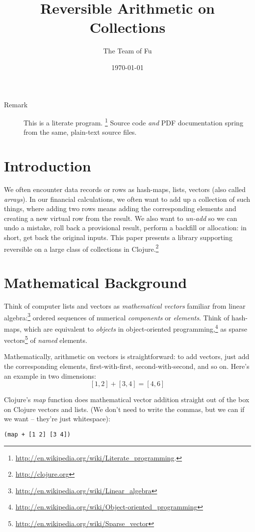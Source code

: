 \documentclass[11pt]{article}
\author{The Team of Fu}
\date{\today}
\title{Reversible Arithmetic on Collections}
\begin{document}
\maketitle
\tableofcontents


\begin{description}
\item[{Remark}] This is a literate program.
\footnote{\url{http://en.wikipedia.org/wiki/Literate_programming}.}
Source code \emph{and} PDF documentation spring
from the same, plain-text source files.
\end{description}

\section{Introduction}
\label{sec-1}

We often encounter data records or rows as hash-maps, lists, vectors
(also called \emph{arrays}). In our financial calculations, we often want
to add up a collection of such things, where adding two rows means
adding the corresponding elements and creating a new virtual row from
the result. We also want to \emph{un-add} so we can undo a mistake, roll
back a provisional result, perform a backfill or allocation: in short,
get back the original inputs. This paper presents a library supporting
reversible on a large class of collections in
Clojure.\footnote{\url{http://clojure.org}}
\section{Mathematical Background}
\label{sec-2}

Think of computer lists and vectors as \emph{mathematical vectors} familiar
from linear algebra:\footnote{\url{http://en.wikipedia.org/wiki/Linear_algebra}}
ordered sequences of numerical \emph{components} or \emph{elements}. Think of
hash-maps, which are equivalent to \emph{objects} in object-oriented
programming,\footnote{\url{http://en.wikipedia.org/wiki/Object-oriented_programming}}
as sparse vectors\footnote{\url{http://en.wikipedia.org/wiki/Sparse_vector}} of
\emph{named} elements.

Mathematically, arithmetic on vectors is straightforward: to add
vectors, just add the corresponding elements, first-with-first,
second-with-second, and so on.  Here's an example in two dimensions:
$$[1, 2] + [3, 4] = [4, 6]$$

Clojure's \emph{map} function does mathematical vector addition straight
out of the box on Clojure vectors and lists.  (We don't need to write
the commas, but we can if we want -- they're just whitespace):
\begin{verbatim}
(map + [1 2] [3 4])
\end{verbatim}
\end{document}

